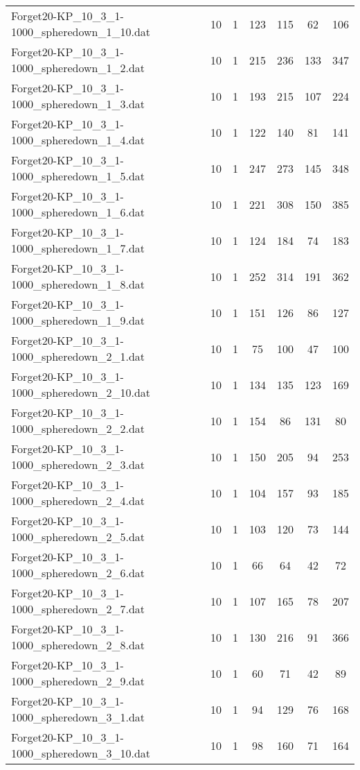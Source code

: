 \begin{table}[!ht]
\begin{tabular}{lcccccc}
Forget20-KP\_10\_3\_1-1000\_spheredown\_1\_10.dat & 10 & 1 & 123 & 115 & 62 & 106 \\
Forget20-KP\_10\_3\_1-1000\_spheredown\_1\_2.dat & 10 & 1 & 215 & 236 & 133 & 347 \\
Forget20-KP\_10\_3\_1-1000\_spheredown\_1\_3.dat & 10 & 1 & 193 & 215 & 107 & 224 \\
Forget20-KP\_10\_3\_1-1000\_spheredown\_1\_4.dat & 10 & 1 & 122 & 140 & 81 & 141 \\
Forget20-KP\_10\_3\_1-1000\_spheredown\_1\_5.dat & 10 & 1 & 247 & 273 & 145 & 348 \\
Forget20-KP\_10\_3\_1-1000\_spheredown\_1\_6.dat & 10 & 1 & 221 & 308 & 150 & 385 \\
Forget20-KP\_10\_3\_1-1000\_spheredown\_1\_7.dat & 10 & 1 & 124 & 184 & 74 & 183 \\
Forget20-KP\_10\_3\_1-1000\_spheredown\_1\_8.dat & 10 & 1 & 252 & 314 & 191 & 362 \\
Forget20-KP\_10\_3\_1-1000\_spheredown\_1\_9.dat & 10 & 1 & 151 & 126 & 86 & 127 \\
Forget20-KP\_10\_3\_1-1000\_spheredown\_2\_1.dat & 10 & 1 & 75 & 100 & 47 & 100 \\
Forget20-KP\_10\_3\_1-1000\_spheredown\_2\_10.dat & 10 & 1 & 134 & 135 & 123 & 169 \\
Forget20-KP\_10\_3\_1-1000\_spheredown\_2\_2.dat & 10 & 1 & 154 & 86 & 131 & 80 \\
Forget20-KP\_10\_3\_1-1000\_spheredown\_2\_3.dat & 10 & 1 & 150 & 205 & 94 & 253 \\
Forget20-KP\_10\_3\_1-1000\_spheredown\_2\_4.dat & 10 & 1 & 104 & 157 & 93 & 185 \\
Forget20-KP\_10\_3\_1-1000\_spheredown\_2\_5.dat & 10 & 1 & 103 & 120 & 73 & 144 \\
Forget20-KP\_10\_3\_1-1000\_spheredown\_2\_6.dat & 10 & 1 & 66 & 64 & 42 & 72 \\
Forget20-KP\_10\_3\_1-1000\_spheredown\_2\_7.dat & 10 & 1 & 107 & 165 & 78 & 207 \\
Forget20-KP\_10\_3\_1-1000\_spheredown\_2\_8.dat & 10 & 1 & 130 & 216 & 91 & 366 \\
Forget20-KP\_10\_3\_1-1000\_spheredown\_2\_9.dat & 10 & 1 & 60 & 71 & 42 & 89 \\
Forget20-KP\_10\_3\_1-1000\_spheredown\_3\_1.dat & 10 & 1 & 94 & 129 & 76 & 168 \\
Forget20-KP\_10\_3\_1-1000\_spheredown\_3\_10.dat & 10 & 1 & 98 & 160 & 71 & 164 \\

\end{tabular}
\end{table}
